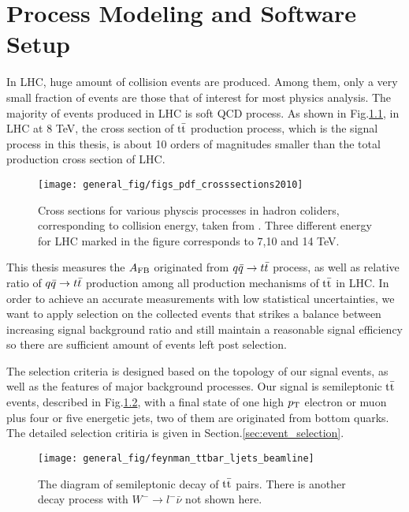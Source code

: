 \chapter{Process Modeling and Software Setup}
\label{sec:modelling}

In LHC, huge amount of collision events are produced. Among them, only a very small fraction of events are those that of interest for most physics analysis. The majority of events produced in LHC is soft QCD process. As shown in Fig.\ref{fig:pp_xsec}, in LHC at 8 TeV, the cross section of $\ttbar$ production process, which is the signal process in this thesis, is about 10 orders of magnitudes smaller than the total production cross section of LHC. 

\begin{figure}
	\centering
	\texttt{[image: general\_fig/figs\_pdf\_crosssections2010]}
	\caption[Cross sections for various physcis processes in hadron coliders]
	{Cross sections for various physcis processes in hadron coliders, corresponding to collision energy, taken from \cite{Plehn:2009nd}. Three different energy for LHC marked in the figure corresponds to 7,10 and 14 TeV.}
	\label{fig:pp_xsec}
\end{figure}

This thesis measures the $A_{\mathrm{FB}}$ originated from $q\bar q \rightarrow t \bar t$ process, as well as relative ratio of $q\bar q \rightarrow t \bar t$ production among all production mechanisms of $\ttbar$ in LHC. In order to achieve an accurate measurements with low statistical uncertainties, we want to apply selection on the collected events that strikes a balance between increasing signal background ratio and still maintain a reasonable signal efficiency so there are sufficient amount of events left post selection.

The selection criteria is designed based on the topology of our signal events, as well as the features of major background processes. Our signal is semileptonic $\ttbar$ events, described in Fig.\ref{fig:TT_semileptonic_1}, with a final state of one high $p_\mathrm{T}$ electron or muon plus four or five energetic jets, two of them are originated from bottom quarks. The detailed selection critiria is given in Section.\ref{sec:event_selection}.

\begin{figure}[hbt]
	\begin{center}
		\texttt{[image: general\_fig/feynman\_ttbar\_ljets\_beamline]}
		\caption [The diagram of semileptonic decay of $\ttbar$ pairs.]
		{\small The diagram of semileptonic decay of $\ttbar$ pairs. There is another decay process with $W^-\rightarrow l^-\bar \nu$ not shown here.}
		\label{fig:TT_semileptonic_1}
	\end{center}
\end{figure}


